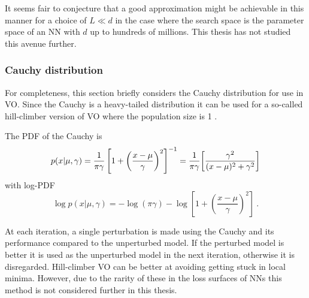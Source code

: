 It seems fair to conjecture that a good approximation might be achievable in this manner for a choice of $L\ll d$ in the case where the search space is the parameter space of an \gls{NN} with $d$ up to hundreds of millions. This thesis has not studied this avenue further.


\subsubsection{Cauchy distribution}
For completeness, this section briefly considers the Cauchy distribution for use in \gls{VO}. Since the Cauchy is a heavy-tailed distribution it can be used for a so-called hill-climber version of \gls{VO} where the population size is 1 \cite{Schaul2011}. 

The \gls{PDF} of the Cauchy is
\begin{equation}
    p(x|\mu,\gamma) = \frac{1}{\pi\gamma}\left[1+\left({\frac{x-\mu}{\gamma}}\right)^{2}\right]^{-1} = \frac{1}{\pi\gamma} {\left[\frac{\gamma ^{2}}{(x-\mu)^{2}+\gamma ^{2}} \right]}
\end{equation}
with log-\gls{PDF}
\begin{equation}
    \log p(x|\mu,\gamma) = - \log(\pi\gamma) - \log\left[1+\left({\frac{x-\mu}{\gamma}}\right)^{2}\right] \ .
\end{equation}

At each iteration, a single perturbation is made using the Cauchy and its performance compared to the unperturbed model. If the perturbed model is better it is used as the unperturbed model in the next iteration, otherwise it is disregarded.
Hill-climber \gls{VO} can be better at avoiding getting stuck in local minima. However, due to the rarity of these in the loss surfaces of \glspl{NN} this method is not considered further in this thesis.



